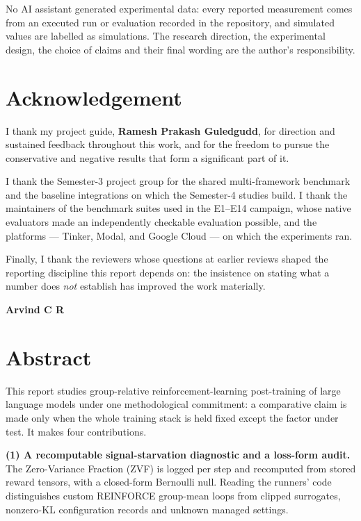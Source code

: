 \documentclass[12pt,a4paper]{report}
\begin{document}
No AI assistant generated experimental data: every reported measurement comes
from an executed run or evaluation recorded in the repository, and simulated
values are labelled as simulations. The research direction,
the experimental design, the choice of claims and their final wording are the
author's responsibility.

\chapter*{Acknowledgement}
\thispagestyle{plain}

I thank my project guide, \textbf{Ramesh Prakash Guledgudd}, for direction and
sustained feedback throughout this work, and for the freedom to pursue the
conservative and negative results that form a significant part of it.

I thank the Semester-3 project group for the shared multi-framework benchmark
and the baseline integrations on which the Semester-4 studies build. I thank
the maintainers of the benchmark suites used in the E1--E14 campaign, whose
native evaluators made an independently checkable evaluation possible, and the
platforms --- Tinker, Modal, and Google Cloud --- on which the experiments ran.

Finally, I thank the reviewers whose questions at earlier reviews shaped the
reporting discipline this report depends on: the insistence on stating what a
number does \emph{not} establish has improved the work materially.

\vspace{0.3in}
\noindent\textbf{Arvind C R}

\chapter*{Abstract}
\thispagestyle{plain}

This report studies group-relative reinforcement-learning post-training of
large language models under one methodological commitment: a comparative
claim is made only when the whole training stack is held fixed except the
factor under test. It makes four contributions.

\textbf{(1) A recomputable signal-starvation diagnostic and a loss-form
audit.} The Zero-Variance Fraction (ZVF) is logged per step and recomputed
from stored reward tensors, with a closed-form Bernoulli null. Reading the
runners' code distinguishes custom REINFORCE group-mean loops from clipped
surrogates, nonzero-KL configuration records and unknown managed settings.
\end{document}
